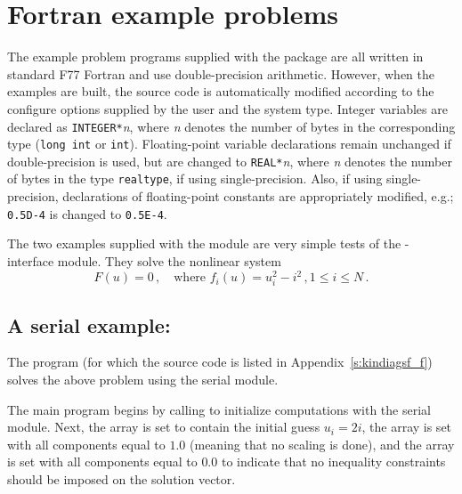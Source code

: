 \section{Fortran example problems}\label{s:ex_fortran}

The {\F} example problem programs supplied with the {\kinsol}
package are all written in standard F77 Fortran and use double-precision
arithmetic. However, when the {\F} examples are built, the source code is
automatically modified according to the configure options supplied by the
user and the system type. Integer variables are declared as {\tt INTEGER*}{\em n},
where {\em n} denotes the number of bytes in the corresponding {\C} type
({\tt long int} or {\tt int}). Floating-point variable declarations remain
unchanged if double-precision is used, but are changed to {\tt REAL*}{\em n},
where {\em n} denotes the number of bytes in the {\sundials} type {\tt realtype},
if using single-precision. Also, if using single-precision, declarations of
floating-point constants are appropriately modified, e.g.; {\tt 0.5D-4} is
changed to {\tt 0.5E-4}.


The two examples supplied with the {\fkinsol} module are very simple tests 
of the {\F}-{\C} interface module. 
They solve the nonlinear system
\begin{equation*}
  F(u) = 0 \, , \quad \text{where } f_i(u) = u_i^2 - i^2 \, , 1 \le i \le N \, . 
\end{equation*}

\subsection{A serial example: }\label{ss:kindiagsf}

The  program (for which the source code is listed in
Appendix~\ref{s:kindiagsf_f}) solves the above problem using the serial
{\nvecs} module.

The main program begins by calling  to initialize computations
with the serial {\nvecs} module. Next, the array  is set to contain
the initial guess $u_i = 2 i$, the array  is set with all 
components equal to $1.0$ (meaning that no scaling is done), and the array
 is set with all components equal to $0.0$ to indicate that no 
inequality constraints should be imposed on the solution vector.

